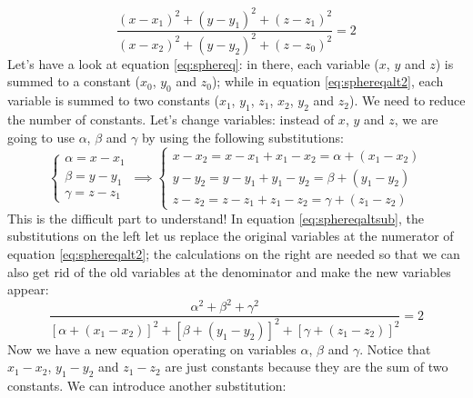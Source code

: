 \begin{equation}\label{eq:sphereqalt2}
    \frac{(x-x_1)^2 + (y-y_1)^2 + (z-z_1)^2}{(x-x_2)^2 + (y-y_2)^2 + (z-z_0)^2} = 2
\end{equation}
Let's have a look at equation \ref{eq:sphereq}: in there, each variable ($x$, $y$ and $z$)
is summed to a constant ($x_0$, $y_0$ and $z_0$); while in equation \ref{eq:sphereqalt2}, each
variable is summed to two constants ($x_1$, $y_1$, $z_1$, $x_2$, $y_2$ and $z_2$). We
need to reduce the number of constants. Let's change variables: instead of $x$, $y$ and $z$,
we are going to use $\alpha$, $\beta$ and $\gamma$ by using the following substitutions:
\begin{equation}\label{eq:sphereqaltsub}
    \begin{cases}
        \alpha = x - x_1\\
        \beta = y - y_1\\
        \gamma = z - z_1
    \end{cases}
    \implies
    \begin{cases}
        x - x_2 = x - x_1 + x_1 - x_2 = \alpha  + (x_1 - x_2)\\
        y - y_2 = y - y_1 + y_1 - y_2 = \beta + (y_1 - y_2)\\
        z - z_2 = z - z_1 + z_1 - z_2 = \gamma + (z_1 - z_2)
    \end{cases}
\end{equation}
This is the difficult part to understand!
In equation \ref{eq:sphereqaltsub}, the substitutions on the left let us replace
the original variables at the numerator of equation \ref{eq:sphereqalt2}; the
calculations on the right are needed so that we can also get rid of the old variables
at the denominator and make the new variables appear:
\begin{equation}\label{eq:sphereqalt3}
    \frac{\alpha^2 + \beta^2 + \gamma^2}{[\alpha  + (x_1 - x_2)]^2 + [\beta + (y_1 - y_2)]^2 + [\gamma + (z_1 - z_2)]^2} = 2
\end{equation}
Now we have a new equation operating on variables $\alpha$, $\beta$ and $\gamma$. Notice that
$x_1 - x_2$, $y_1 - y_2$ and $z_1 - z_2$ are just constants because they are the sum of two
constants. We can introduce another
substitution:
